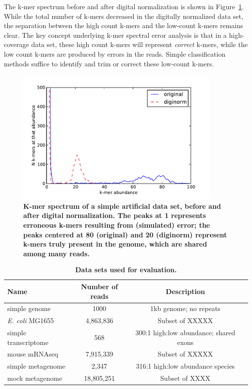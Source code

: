 \documentclass{article}
\begin{document}
The k-mer spectrum before and after digital normalization is shown in
Figure~\ref{fig:spectrum}.  While the total number of k-mers decreased
in the digitally normalized data set, the separation between the high
count k-mers and the low-count k-mers remains clear.  The key concept
underlying k-mer spectral error analysis is that in a high-coverage
data set, these high count k-mers will represent {\em correct} k-mers,
while the low count k-mers are produced by errors in the reads.
Simple classification methods suffice to identify and trim or correct
these low-count k-mers.

\begin{figure}[!ht]
 \centerline{\includegraphics[width=4in]{./figures/kmer-spectrum}}
\caption{\bf K-mer spectrum of a simple artificial data set, before
  and after digital normalization.  The peaks at 1 represents
  erroneous k-mers resulting from (simulated) error; the peaks
  centered at 80 (original) and 20 (diginorm) represent k-mers truly
  present in the genome, which are shared among many reads.}
\label{fig:spectrum}
\end{figure}



\begin{table}

\centering
\begin{tabular}{|l|c|c|l|}
\hline
Name & Number of reads & Description \\
\hline
simple genome & 1000 & 1kb genome; no repeats \\
{\em E. coli} MG1655 & 4,863,836 & Subset of XXXXX \\
simple transcriptome & 568 & 300:1 high:low abundance; shared exons \\
mouse mRNAseq & 7,915,339 & Subset of XXXXX \\
simple metagenome & 2,347 & 316:1 high:low abundance species \\
mock metagenome & 18,805,251 & Subset of XXXX \\
\hline
\end{tabular}

\caption{{\bf Data sets used for evaluation.}}

\label{tab:data}
\end{table}
\end{document}
